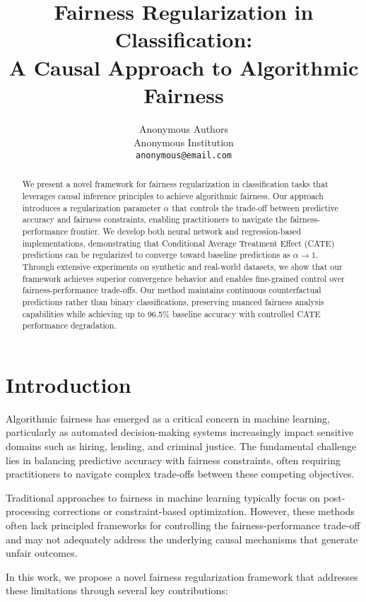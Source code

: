 \documentclass{article} %
\title{Fairness Regularization in Classification: \\
A Causal Approach to Algorithmic Fairness}
\author{Anonymous Authors \\
Anonymous Institution \\
\texttt{anonymous@email.com}
}
\begin{document}
\maketitle

\begin{abstract}
We present a novel framework for fairness regularization in classification tasks that leverages causal inference principles to achieve algorithmic fairness. Our approach introduces a regularization parameter $\alpha$ that controls the trade-off between predictive accuracy and fairness constraints, enabling practitioners to navigate the fairness-performance frontier. We develop both neural network and regression-based implementations, demonstrating that Conditional Average Treatment Effect (CATE) predictions can be regularized to converge toward baseline predictions as $\alpha \to 1$. Through extensive experiments on synthetic and real-world datasets, we show that our framework achieves superior convergence behavior and enables fine-grained control over fairness-performance trade-offs. Our method maintains continuous counterfactual predictions rather than binary classifications, preserving nuanced fairness analysis capabilities while achieving up to 96.5\% baseline accuracy with controlled CATE performance degradation.
\end{abstract}

\section{Introduction}

Algorithmic fairness has emerged as a critical concern in machine learning, particularly as automated decision-making systems increasingly impact sensitive domains such as hiring, lending, and criminal justice. The fundamental challenge lies in balancing predictive accuracy with fairness constraints, often requiring practitioners to navigate complex trade-offs between these competing objectives.

Traditional approaches to fairness in machine learning typically focus on post-processing corrections or constraint-based optimization. However, these methods often lack principled frameworks for controlling the fairness-performance trade-off and may not adequately address the underlying causal mechanisms that generate unfair outcomes.

In this work, we propose a novel fairness regularization framework that addresses these limitations through several key contributions:
\end{document}
